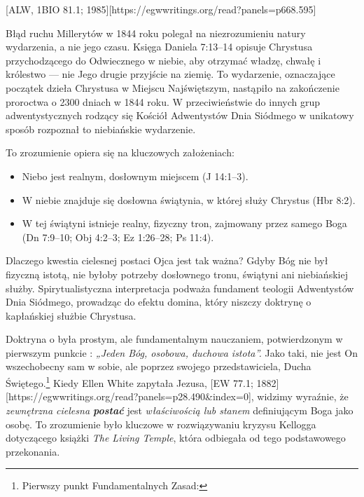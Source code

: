 [ALW, 1BIO 81.1; 1985][https://egwwritings.org/read?panels=p668.595]

Błąd ruchu Millerytów w 1844 roku polegał na niezrozumieniu natury wydarzenia, a nie jego czasu. Księga Daniela 7:13--14 opisuje Chrystusa przychodzącego do Odwiecznego w niebie, aby otrzymać władzę, chwałę i królestwo — nie Jego drugie przyjście na ziemię. To wydarzenie, oznaczające początek dzieła Chrystusa w Miejscu Najświętszym, nastąpiło na zakończenie proroctwa o 2300 dniach w 1844 roku. W przeciwieństwie do innych grup adwentystycznych rodzący się Kościół Adwentystów Dnia Siódmego w unikatowy sposób rozpoznał to niebiańskie wydarzenie.

To zrozumienie opiera się na kluczowych założeniach:
\begin{itemize}
    \item Niebo jest realnym, dosłownym miejscem (J 14:1--3).
    \item W niebie znajduje się dosłowna świątynia, w której służy Chrystus (Hbr 8:2).
    \item W tej świątyni istnieje realny, fizyczny tron, zajmowany przez samego Boga (Dn 7:9--10; Obj 4:2--3; Ez 1:26--28; Ps 11:4).
\end{itemize}

Dlaczego kwestia cielesnej postaci Ojca jest tak ważna? Gdyby Bóg nie był fizyczną istotą, nie byłoby potrzeby dosłownego tronu, świątyni ani niebiańskiej służby. Spirytualistyczna interpretacja podważa fundament teologii Adwentystów Dnia Siódmego, prowadząc do efektu domina, który niszczy doktrynę o kapłańskiej służbie Chrystusa.

Doktryna o  była prostym, ale fundamentalnym nauczaniem, potwierdzonym w pierwszym punkcie : \textit{„Jeden Bóg, osobowa, duchowa istota”.} Jako taki, nie jest On wszechobecny sam w sobie, ale poprzez swojego przedstawiciela, Ducha Świętego.\footnote{Pierwszy punkt Fundamentalnych Zasad: } Kiedy Ellen White zapytała Jezusa, [EW 77.1; 1882][https://egwwritings.org/read?panels=p28.490&index=0], widzimy wyraźnie, że \textit{zewnętrzna cielesna \textbf{postać}} jest \textit{właściwością lub stanem} definiującym Boga jako osobę. To zrozumienie było kluczowe w rozwiązywaniu kryzysu Kellogga dotyczącego książki \textit{The Living Temple}, która odbiegała od tego podstawowego przekonania.

